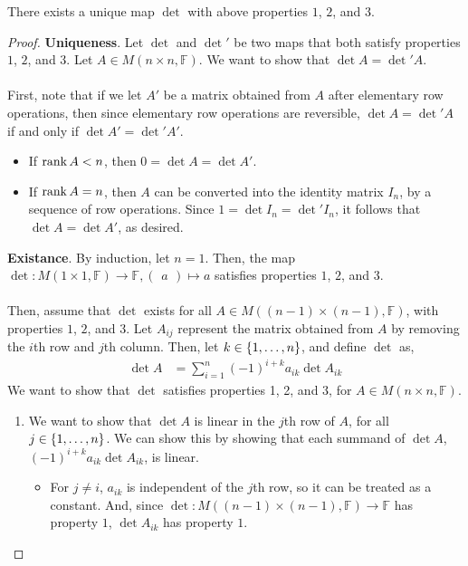 \documentclass[letterpaper,12pt]{article}
\begin{document}
\begin{theorem}
There exists a unique map $\det$ with above properties $1$, $2$, and $3$.
\end{theorem}
\begin{proof}
\textbf{Uniqueness}. Let $\det$ and $\det'$ be two maps that both satisfy properties $1$, $2$, and $3$. Let $A \in M(n \times n, \mathbb{F})$. We want to show that $\det{A} = \det'{A}$.
    \\ \\ First, note that if we let $A'$ be a matrix obtained from $A$ after elementary row operations, then since elementary row operations are reversible, $\det{A} = \det'{A}$ if and only if $\det{A'} = \det'{A'}$.
    \begin{itemize}
        \item If $\operatorname{rank}{A} < n$, then $0 = \det{A} = \det{A'}$.
        \item If $\operatorname{rank}{A} = n$, then $A$ can be converted into the identity matrix $I_n$, by a sequence of row operations. Since $1 = \det{I_n} = \det'{I_n}$, it follows that $\det{A} = \det{A'}$, as desired.
    \end{itemize}
\textbf{Existance}. By induction, let $n = 1$. Then, the map $\det: M(1 \times 1, \mathbb{F}) \rightarrow \mathbb{F}, \begin{pmatrix} a \end{pmatrix} \mapsto a$ satisfies properties $1$, $2$, and $3$.
\\ \\ Then, assume that $\det$ exists for all $A \in M((n-1) \times (n-1), \mathbb{F})$, with properties $1$, $2$, and $3$. Let $A_{ij}$ represent the matrix obtained from $A$ by removing the $i$th row and $j$th column. Then, let $k \in \left\{ 1, \dots, n \right\}$, and define $\det$ as,
\begin{align*}
    \det{A} & = \sum_{i=1}^n (-1)^{i+k} a_{ik} \det{A_{ik}}
\end{align*}
We want to show that $\det$ satisfies properties 1, 2, and 3, for $A \in M(n \times n, \mathbb{F})$.
\begin{enumerate}
    \item We want to show that $\det{A}$ is linear in the $j$th row of $A$, for all $j \in \left\{ 1, \dots, n \right\}$. We can show this by showing that each summand of $\det{A}$, $(-1)^{i+k} a_{ik} \det{A_{ik}}$, is linear.
    \begin{itemize}
        \item For $j \neq i$, $a_{ik}$ is independent of the $j$th row, so it can be treated as a constant. And, since $\det: M((n-1) \times (n-1), \mathbb{F}) \rightarrow \mathbb{F}$ has property $1$, $\det{A_{ik}}$ has property $1$.

\end{itemize}
\end{enumerate}
\end{proof}
\end{document}
